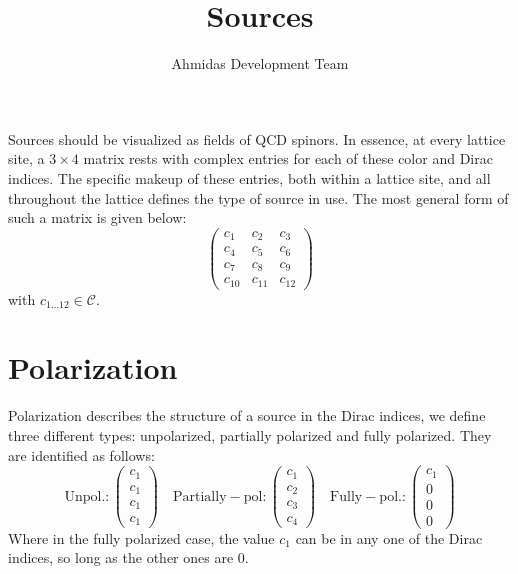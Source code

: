 \documentclass[a4paper,12pt,twoside]{article}
\author{Ahmidas Development Team}
\title{Sources}
\begin{document}
\maketitle

Sources should be visualized as fields of QCD spinors. In essence, at every lattice site, a $3 \times 4$ matrix rests with complex entries for each of these color and Dirac indices. The specific makeup of these entries, both within a lattice site, and all throughout the lattice defines the type of source in use. The most general form of such a matrix is given below:
\begin{equation}
 \left(
\begin{array}{ccc}
 c_1 & c_2 & c_3 \\
 c_4 & c_5 & c_6 \\
 c_7 & c_8 & c_9 \\
 c_{10} & c_{11} & c_{12}
\end{array}
\right)
\end{equation}
with $c_{1\dots 12} \in \mathcal{C}$.
\section{Polarization}
Polarization describes the structure of a source in the Dirac indices, we define three different types: unpolarized, partially polarized and fully polarized. They are identified as follows:
\begin{equation}
 \mathrm{Unpol.: }\left(
\begin{array}{c}
 c_1 \\
 c_1 \\
 c_1 \\
 c_1 
\end{array}
\right)\quad
 \mathrm{Partially-pol: }\left(
\begin{array}{c}
 c_1 \\
 c_2 \\
 c_3 \\
 c_4 
\end{array}
\right)\quad
 \mathrm{Fully-pol.: }\left(
\begin{array}{c}
 c_1 \\
 0 \\
 0 \\
 0 
\end{array}
\right)
\end{equation}
Where in the fully polarized case, the value $c_1$ can be in any one of the Dirac indices, so long as the other ones are $0$.
\end{document}
